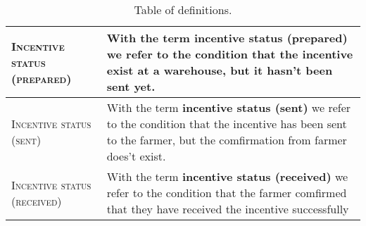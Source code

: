 \begin{table}[H]
\begin{tabular}{|m{}|m{}|}
        \textsc{Incentive status (prepared)}     &   With the term \textbf{incentive status (prepared)} we refer to the condition that the incentive exist at a warehouse, but it hasn't been sent yet. \\
        \hline
        \textsc{Incentive status (sent)}     &   With the term \textbf{incentive status (sent)} we refer to the condition that the incentive has been sent to the farmer, but the comfirmation from farmer does't exist. \\
        \hline
        \textsc{Incentive status (received)}     &   With the term \textbf{incentive status (received)} we refer to the condition that the farmer comfirmed that they have received the incentive successfully \\
        \hline
    \end{tabular}
    
    \caption{\label{tab:def_table}Table of definitions.}
    
\end{table}


